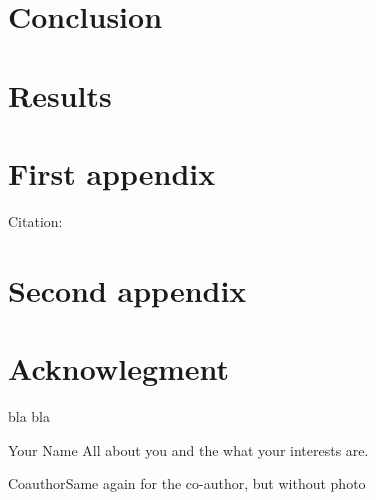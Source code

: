 \documentclass[twocolumn,english]{IEEEtran}
\theoremstyle{plain}
\theoremstyle{plain}
\begin{document}
\section{Conclusion}

\section{Results}

\appendices{}

\section{First appendix}

Citation: \cite{IEEEexample:beebe_archive}

\section{Second appendix}

\section*{Acknowlegment}

bla bla





\begin{IEEEbiography}
{Your Name} All about you and the what your interests are.

\end{IEEEbiography}

\begin{IEEEbiographynophoto}
{Coauthor}Same again for the co-author, but without photo\end{IEEEbiographynophoto}
\end{document}
